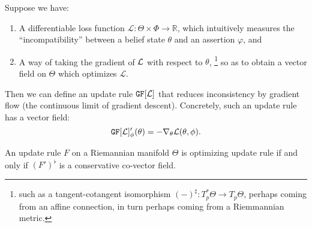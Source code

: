 Suppose we have:
\begin{enumerate}[nosep]
	\item A differentiable loss function $\mathcal L : \Theta \times \Phi  \to \mathbb R$, which intuitively measures the ``incompatibility'' between a belief state $\theta$ and an assertion $\varphi$, and
	\item
		A way of taking the gradient of ${\cal L}$ with respect to $\theta$,%
			\footnote{
			such as a tangent-cotangent isomorphism $(-)^\sharp : T^*_p\Theta \to T_p \Theta$, perhaps coming from an affine connection, in turn perhaps coming from a Riemmannian metric.}
        so as to obtain a vector field on $\Theta$ which optimizes $\mathcal L.$
\end{enumerate}
\def\GD#1{\mathtt{GF}[#1]}
\def\NGD#1{\mathtt{NGF}[#1]}

Then we can define an update rule $\GD {\cal L}$ that reduces inconsistency by gradient flow (the continuous limit of gradient descent). Concretely, such an update rule has a vector field:
\[
	\GD {\cal L}'_\phi(\theta) = - \nabla_\theta {\cal L}(\theta,\phi).
\]


\begin{prop}
	An update rule $F$ on a Riemannian manifold $\Theta$ is optimizing update rule if and only if $(F')^\flat$ is a conservative co-vector field.
	\cite[Prop 11.40]{lee2013smooth}
\end{prop}



